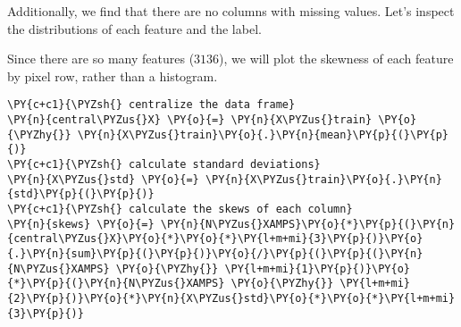     Additionally, we find that there are no columns with missing values.
Let's inspect the distributions of each feature and the label.

    Since there are so many features (\(3136\)), we will plot the skewness
of each feature by pixel row, rather than a histogram.

    \begin{tcolorbox}[breakable, size=fbox, boxrule=1pt, pad at break*=1mm,colback=cellbackground, colframe=cellborder]
\begin{Verbatim}[commandchars=\\\{\}]
\PY{c+c1}{\PYZsh{} centralize the data frame}
\PY{n}{central\PYZus{}X} \PY{o}{=} \PY{n}{X\PYZus{}train} \PY{o}{\PYZhy{}} \PY{n}{X\PYZus{}train}\PY{o}{.}\PY{n}{mean}\PY{p}{(}\PY{p}{)}
\PY{c+c1}{\PYZsh{} calculate standard deviations}
\PY{n}{X\PYZus{}std} \PY{o}{=} \PY{n}{X\PYZus{}train}\PY{o}{.}\PY{n}{std}\PY{p}{(}\PY{p}{)}
\PY{c+c1}{\PYZsh{} calculate the skews of each column}
\PY{n}{skews} \PY{o}{=} \PY{n}{N\PYZus{}XAMPS}\PY{o}{*}\PY{p}{(}\PY{n}{central\PYZus{}X}\PY{o}{*}\PY{o}{*}\PY{l+m+mi}{3}\PY{p}{)}\PY{o}{.}\PY{n}{sum}\PY{p}{(}\PY{p}{)}\PY{o}{/}\PY{p}{(}\PY{p}{(}\PY{n}{N\PYZus{}XAMPS} \PY{o}{\PYZhy{}} \PY{l+m+mi}{1}\PY{p}{)}\PY{o}{*}\PY{p}{(}\PY{n}{N\PYZus{}XAMPS} \PY{o}{\PYZhy{}} \PY{l+m+mi}{2}\PY{p}{)}\PY{o}{*}\PY{n}{X\PYZus{}std}\PY{o}{*}\PY{o}{*}\PY{l+m+mi}{3}\PY{p}{)}
\end{Verbatim}
\end{tcolorbox}


